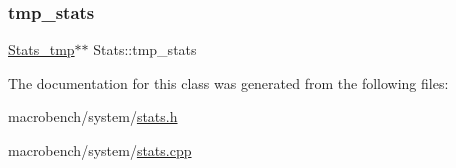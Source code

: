 \mbox{\label{classStats_aa34f9c95002659dc382038861b3714db}} 
\subsubsection{\texorpdfstring{tmp\+\_\+stats}{tmp\_stats}}
{\footnotesize\ttfamily \hyperlink{classStats__tmp}{Stats\+\_\+tmp}$\ast$$\ast$ Stats\+::tmp\+\_\+stats}



The documentation for this class was generated from the following files\+:\begin{DoxyCompactItemize}
\item 
macrobench/system/\hyperlink{stats_8h}{stats.\+h}\item 
macrobench/system/\hyperlink{stats_8cpp}{stats.\+cpp}\end{DoxyCompactItemize}
